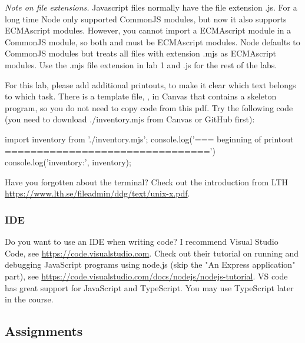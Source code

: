\documentclass[fleqn, article, a4paper]{memoir}
\begin{document}
\noindent \emph{Note on file extensions.} Javascript files normally have the file extension .js. For a long time Node only supported CommonJS modules, but now it also supports ECMAscript modules. However, you cannot import a ECMAscript module in a CommonJS module, so both  and  must be ECMAscript modules. Node defaults to CommonJS modules but treats all files with extension .mjs as ECMAscript modules. Use the .mjs file extension in lab 1 and .js for the rest of the labs.
 
For this lab, please add additional printouts, to make it clear which text belongs to which task. There is a template file, , in Canvas that contains a skeleton program, so you do not need to copy code from this pdf. Try the following code (you need to download ./inventory.mjs from Canvas or GitHub first):
\begin{Code}
import inventory from './inventory.mjs';
console.log('\n=== beginning of printout ================================')
console.log('inventory:', inventory);
\end{Code}

\noindent Have you forgotten about the terminal? Check out the introduction from LTH \url{https://www.lth.se/fileadmin/ddg/text/unix-x.pdf}.

\subsubsection*{IDE}

\noindent Do you want to use an IDE when writing code? I recommend Visual Studio Code, see \url{https://code.visualstudio.com}. Check out their tutorial on running and debugging JavaScript programs using node.js (skip the "An Express application" part), see \url{https://code.visualstudio.com/docs/nodejs/nodejs-tutorial}. VS code has great support for JavaScript and TypeScript. You may use TypeScript later in the course.

\subsection*{Assignments}
\end{document}
